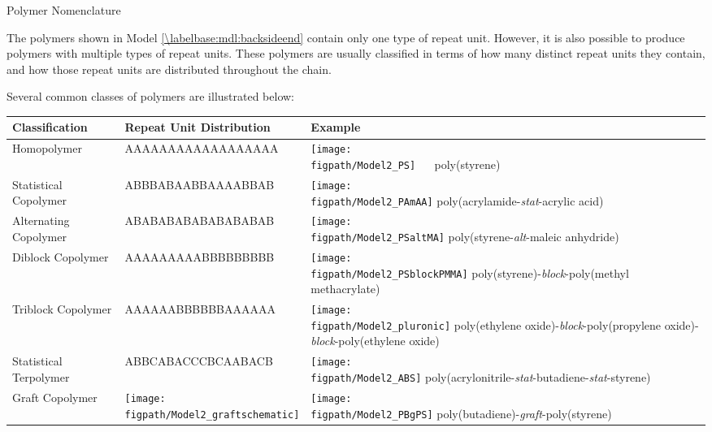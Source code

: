 \begin{activity}{Polymer Nomenclature}
\begin{model}[Composition]
	The polymers shown in Model \ref{\labelbase:mdl:backsideend} contain only one type of repeat unit.  However, it is also possible to produce polymers with multiple types of repeat units.  These polymers are usually classified in terms of how many distinct repeat units they contain, and how those repeat units are distributed throughout the chain.
	
	Several common classes of polymers are illustrated below:
	
	{\renewcommand{\arraystretch}{1.75}
	\begin{tabular}{m{0.78in}m{2in}m{2.5in}}
		\hline
		Classification & Repeat Unit Distribution & Example\\
		\hline
		Homopolymer & AAAAAAAAAAAAAAAAAA & \texttt{[image: \\figpath/Model2\_PS]} ~~ poly(styrene) \\\hline
		Statistical Copolymer & ABBBABAABBAAAABBAB & \texttt{[image: \\figpath/Model2\_PAmAA]} \newline poly(acrylamide-\emph{stat}-acrylic acid)\\\hline
		Alternating Copolymer & ABABABABABABABABAB & \texttt{[image: \\figpath/Model2\_PSaltMA]} \newline poly(styrene-\emph{alt}-maleic anhydride)\\\hline
		Diblock Copolymer & AAAAAAAAABBBBBBBBB & \texttt{[image: \\figpath/Model2\_PSblockPMMA]} \newline poly(styrene)-\emph{block}-poly(methyl methacrylate)\\\hline
		Triblock Copolymer & AAAAAABBBBBBAAAAAA & \texttt{[image: \\figpath/Model2\_pluronic]} \newline poly(ethylene oxide)-\emph{block}-poly(propyl\-ene oxide)-\emph{block}-poly(ethylene oxide) \\\hline
		Statistical Terpolymer & ABBCABACCCBCAABACB & \texttt{[image: \\figpath/Model2\_ABS]} \newline poly(acrylonitrile-\emph{stat}-butadiene-\emph{stat}-styrene) \\\hline
		Graft Copolymer & \texttt{[image: \\figpath/Model2\_graftschematic]} & \texttt{[image: \\figpath/Model2\_PBgPS]} \newline poly(butadiene)-\emph{graft}-poly(styrene) 
	\end{tabular}
	}

\end{model}

\begin{ctqs}


\end{ctqs}
\end{activity}
